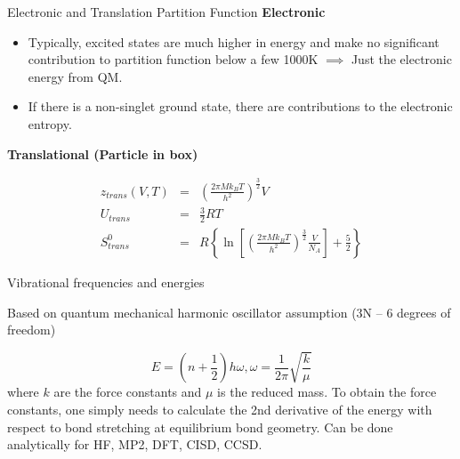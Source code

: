 \documentclass[aspectratio=169]{beamer}
\begin{document}
    \begin{frame}{Electronic and Translation Partition Function}
        \textbf{Electronic}
        \begin{itemize}
            \item Typically, excited states are much higher in energy and make no significant contribution to partition function below a few 1000K $\implies$ Just the electronic energy from QM.
            \item If there is a non-singlet ground state, there are contributions to the electronic entropy.
        \end{itemize}

        \textbf{Translational (Particle in box)}

        \begin{eqnarray*}
            z_{trans}(V, T) & = & \left( \frac{2\pi Mk_BT}{h^2} \right)^{\frac{3}{2}} V\\
            U_{trans} & = & \frac{3}{2} RT\\
            S_{trans}^0 & = & R\left \{ \ln \left [{\left( \frac{2\pi Mk_BT}{h^2} \right) ^{\frac{3}{2}}}  \frac{V}{N_A} \right ] + \frac{5}{2} \right  \}
        \end{eqnarray*}

    \end{frame}


    \begin{frame}{Vibrational frequencies and energies}

        Based on quantum mechanical harmonic oscillator assumption (3N – 6 degrees of freedom)

        \begin{equation*}
            E = (n+\frac{1}{2})h\omega,  \omega = \frac{1}{2\pi}\sqrt{\frac{k}{\mu}}
        \end{equation*}
        where $k$ are the force constants and $\mu$ is the reduced mass.\newline
        \newline
        To obtain the force constants, one simply needs to calculate the 2nd derivative of the energy with respect to bond stretching at equilibrium bond geometry.\newline
        \newline
        Can be done analytically for HF, MP2, DFT, CISD, CCSD.

    \end{frame}
\end{document}
